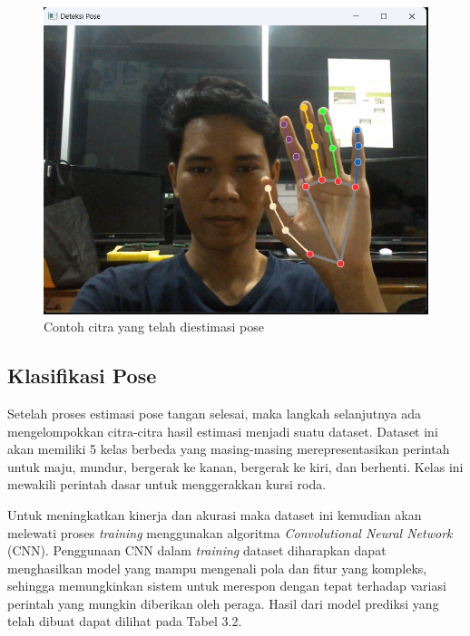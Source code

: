 \begin{figure} [ht] \centering
    \includegraphics[scale=0.9]{gambar/bab3/EstimasiPose.png}
    \caption{Contoh citra yang telah diestimasi pose}
    \label{fig:contoh citra yang telah diestimasi pose}
\end{figure}

\subsection{Klasifikasi Pose}
Setelah proses estimasi pose tangan selesai, maka langkah selanjutnya ada mengelompokkan citra-citra hasil estimasi menjadi suatu dataset. Dataset ini akan memiliki 5 kelas berbeda yang masing-masing merepresentasikan perintah untuk maju, mundur, bergerak ke kanan, bergerak ke kiri, dan berhenti. Kelas ini mewakili perintah dasar untuk menggerakkan kursi roda. 

Untuk meningkatkan kinerja dan akurasi maka dataset ini kemudian akan melewati proses \emph{training} menggunakan algoritma \emph{Convolutional Neural Network} (CNN). Penggunaan CNN dalam \emph{training} dataset diharapkan dapat menghasilkan model yang mampu mengenali pola dan fitur yang kompleks, sehingga memungkinkan sistem untuk merespon dengan tepat terhadap variasi perintah yang mungkin diberikan oleh peraga. Hasil dari model prediksi yang telah dibuat dapat dilihat pada Tabel 3.2.

\newpage

